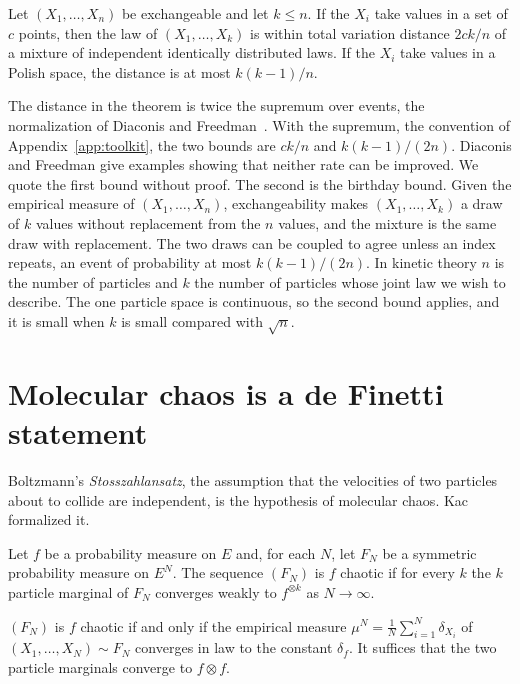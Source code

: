\begin{theorem}
\label{thm:diaconis_freedman}
Let $(X_1,\dots,X_n)$ be exchangeable and let $k\leq n$. If the $X_i$ take values in a set of $c$ points, then the law of $(X_1,\dots,X_k)$ is within total variation distance $2ck/n$ of a mixture of independent identically distributed laws. If the $X_i$ take values in a Polish space, the distance is at most $k(k-1)/n$.
\end{theorem}

The distance in the theorem is twice the supremum over events, the normalization of Diaconis and Freedman~\cite{diaconisfreedman1980}. With the supremum, the convention of Appendix~\ref{app:toolkit}, the two bounds are $ck/n$ and $k(k-1)/(2n)$. Diaconis and Freedman give examples showing that neither rate can be improved. We quote the first bound without proof. The second is the birthday bound. Given the empirical measure of $(X_1,\dots,X_n)$, exchangeability makes $(X_1,\dots,X_k)$ a draw of $k$ values without replacement from the $n$ values, and the mixture is the same draw with replacement. The two draws can be coupled to agree unless an index repeats, an event of probability at most $k(k-1)/(2n)$. In kinetic theory $n$ is the number of particles and $k$ the number of particles whose joint law we wish to describe. The one particle space is continuous, so the second bound applies, and it is small when $k$ is small compared with $\sqrt n$.

\section{Molecular chaos is a de Finetti statement}

Boltzmann's \emph{Stosszahlansatz}, the assumption that the velocities of two particles about to collide are independent, is the hypothesis of molecular chaos. Kac formalized it.

\begin{definition}[Chaos]
Let $f$ be a probability measure on $E$ and, for each $N$, let $F_N$ be a symmetric probability measure on $E^N$. The sequence $(F_N)$ is $f$ chaotic if for every $k$ the $k$ particle marginal of $F_N$ converges weakly to $f^{\otimes k}$ as $N\to\infty$.
\end{definition}

\begin{theorem}
\label{thm:sznitman}
$(F_N)$ is $f$ chaotic if and only if the empirical measure $\mu^N = \frac1N\sum_{i=1}^N\delta_{X_i}$ of $(X_1,\dots,X_N)\sim F_N$ converges in law to the constant $\delta_f$. It suffices that the two particle marginals converge to $f\otimes f$.
\end{theorem}

